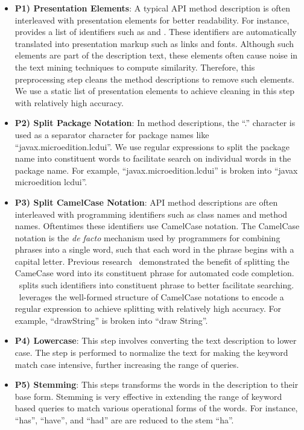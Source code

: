 \begin{itemize}
	
	\item \textbf{P1) Presentation Elements}: A typical API method description is often interleaved with presentation elements for better readability. For instance,  provides a list of identifiers such as   and  . These identifiers are automatically translated into presentation markup such as links and fonts. Although such elements are part of the description text, these elements often cause noise in the text mining techniques to compute similarity. Therefore, this preprocessing step cleans the method descriptions to remove such elements. We use a static list of presentation elements to achieve cleaning in this step with relatively high accuracy.
	
	\item \textbf{P2) Split Package Notation}: In method descriptions, the ``.'' character is used as a separator character for package names like ``javax.microedition.lcdui''. We use regular expressions to split the package name into constituent words to facilitate search on individual words in the package name. For example, ``javax.microedition.lcdui'' is broken into ``javax microedition lcdui''.

	\item \textbf{P3) Split CamelCase Notation}: API method descriptions are often interleaved with programming identifiers such as class names and method names.
	Oftentimes these identifiers use CamelCase notation.
	The CamelCase notation is the \textit{de facto} mechanism used by programmers for combining phrases into a single word, such that each word in the phrase begins with a capital letter.
	Previous research~\cite{Little2009} demonstrated the benefit of splitting the CameCase word into its constituent phrase for automated code completion.
	\tool\ splits such identifiers into constituent phrase to better facilitate searching.
	\tool\ leverages the well-formed structure of CamelCase notations to encode a regular expression to achieve splitting with relatively high accuracy.
	For example, ``drawString'' is broken into ``draw String''.   

	\item \textbf{P4) Lowercase}: This step involves converting the text description to lower case. The step is performed to normalize the text for making the keyword match case intensive, further increasing the range of queries.
	
	\item \textbf{P5) Stemming}: This steps transforms the words in the description to their base form. Stemming is very effective in extending the range of keyword based queries to match various operational forms of the words. For instance, ``has'', ``have'', and ``had'' are are reduced to the stem ``ha''.  
	
\end{itemize}


